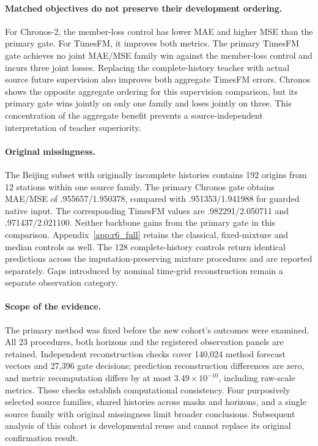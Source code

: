\paragraph{Matched objectives do not preserve their development ordering.}
For Chronos-2, the member-loss control has lower MAE and higher MSE than the primary gate. For TimesFM, it improves both metrics. The primary TimesFM gate achieves no joint MAE/MSE family win against the member-loss control and incurs three joint losses. Replacing the complete-history teacher with actual source future supervision also improves both aggregate TimesFM errors. Chronos shows the opposite aggregate ordering for this supervision comparison, but its primary gate wins jointly on only one family and loses jointly on three. This concentration of the aggregate benefit prevents a source-independent interpretation of teacher superiority.

\paragraph{Original missingness.}
The Beijing subset with originally incomplete histories contains 192 origins from 12 stations within one source family. The primary Chronos gate obtains MAE/MSE of .955657/1.950378, compared with .951353/1.941988 for guarded native input. The corresponding TimesFM values are .982291/2.050711 and .971437/2.021100. Neither backbone gains from the primary gate in this comparison. Appendix~\ref{app:r6_full} retains the classical, fixed-mixture and median controls as well. The 128 complete-history controls return identical predictions across the imputation-preserving mixture procedures and are reported separately. Gaps introduced by nominal time-grid reconstruction remain a separate observation category.

\paragraph{Scope of the evidence.}
The primary method was fixed before the new cohort's outcomes were examined. All 23 procedures, both horizons and the registered observation panels are retained. Independent reconstruction checks cover 140,024 method forecast vectors and 27,396 gate decisions; prediction reconstruction differences are zero, and metric recomputation differs by at most $3.49\times10^{-10}$, including raw-scale metrics. These checks establish computational consistency. Four purposively selected source families, shared histories across masks and horizons, and a single source family with original missingness limit broader conclusions. Subsequent analysis of this cohort is developmental reuse and cannot replace its original confirmation result.
